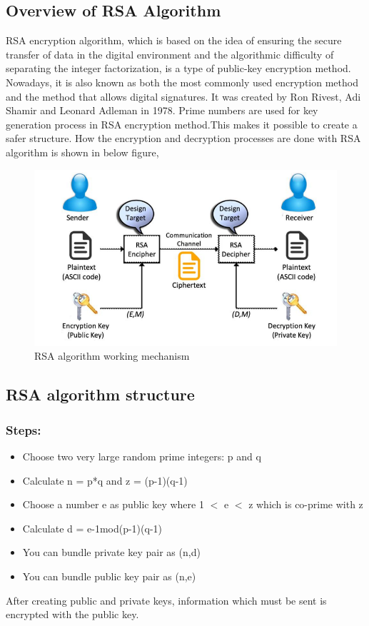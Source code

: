 \subsection{Overview of RSA Algorithm}
RSA encryption algorithm, which is based on the idea of ensuring the secure transfer of data in the digital environment and the algorithmic difficulty of separating the integer factorization, is a type of public-key encryption method. Nowadays, it is also known as both the most commonly used encryption method and the method that allows digital signatures. It was created by Ron Rivest, Adi Shamir and Leonard Adleman  in 1978. Prime numbers are used for key generation process in RSA encryption method.This makes it possible to create a safer structure. How the encryption and decryption processes
are done with RSA algorithm is shown in below figure,
\begin{figure}[H]
	\centering
	\includegraphics[width=160mm]{images/rsa algo.png}
	\caption{RSA algorithm working mechanism}
	\label{figdecisionalgo1} %
\end{figure}
\pagebreak

\subsection{RSA algorithm structure}
\subsubsection{Steps:}
\vspace{-18pt}
\begin{itemize}
	\item Choose two very large random prime integers: p and q
	\item Calculate n = p*q and z = (p-1)(q-1)
	\item Choose a number e as public key where 1 $<$ e $<$ z which is co-prime with z
	\item Calculate d = e-1mod(p-1)(q-1)
	\item You can bundle private key pair as (n,d)
	\item You can bundle public key pair as (n,e)
\end{itemize}
After creating public and private keys, information which must be sent is encrypted with the
public key.
